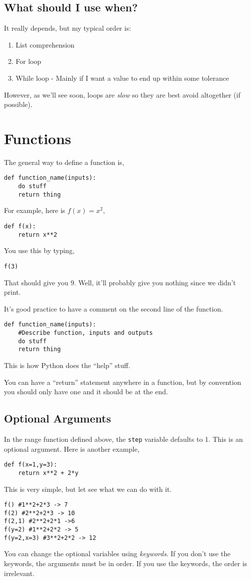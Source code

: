 \documentclass[11pt,letterpaper]{article}
\begin{document}
\subsection{What should I use when?}
It really depends, but my typical order is:
\begin{enumerate}
 \item List comprehension
 \item For loop
 \item While loop - Mainly if I want a value to end up within some tolerance
\end{enumerate}

However, as we'll see soon, loops are \emph{slow} so they are best avoid altogether (if possible).

\section{Functions}
The general way to define a function is,
\begin{verbatim}
def function_name(inputs):
    do stuff
    return thing
\end{verbatim}

For example, here is $f(x) = x^2$,
\begin{verbatim}
def f(x):
    return x**2
\end{verbatim}
You use this by typing,
\begin{verbatim}
f(3)
\end{verbatim}
That should give you 9. Well, it'll probably give you nothing since we didn't print.

It's good practice to have a comment on the second line of the function. 
\begin{verbatim}
def function_name(inputs):
    #Describe function, inputs and outputs
    do stuff
    return thing
\end{verbatim}
This is how Python does the ``help'' stuff. 

You can have a ``return'' statement anywhere in a function, but by convention you should only have
one and it should be at the end.


\subsection{Optional Arguments} 
In the range function defined above, the \texttt{step} variable defaults to 1. This is an optional
argument. Here is another example,
\begin{verbatim}
def f(x=1,y=3):
    return x**2 + 2*y
\end{verbatim}
This is very simple, but let see what we can do with it.
\begin{verbatim}
f() #1**2+2*3 -> 7
f(2) #2**2+2*3 -> 10
f(2,1) #2**2+2*1 ->6
f(y=2) #1**2+2*2 -> 5
f(y=2,x=3) #3**2+2*2 -> 12
\end{verbatim}
You can change the optional variables using \emph{keywords}. If you don't use the keywords, the
arguments must be in order. If you use the keywords, the order is irrelevant. 
\end{document}

